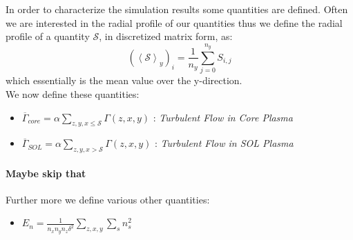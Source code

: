 \documentclass[master.tex]{subfiles}
\begin{document}
In order to characterize the simulation results some quantities are defined. Often we are interested in the radial profile of our quantities thus we define the radial profile of a quantity $\mathcal{S}$, in discretized matrix form, as:
\begin{equation}
    (\left<\mathcal{S}\right>_y)_i = \frac{1}{n_y} \sum_{j=0}^{n_y} S_{i, j}
\end{equation}
which essentially is the mean value over the y-direction.\\
We now define these quantities:

\begin{itemize}
    \item $\overline{\Gamma}_{core} = \alpha \sum_{z, y, x \leq \mathcal{S}} \Gamma(z,x,y)$ : \textit{Turbulent Flow in Core Plasma}
    \item $\overline{\Gamma}_{SOL} = \alpha \sum_{z, y, x > \mathcal{S}} \Gamma(z,x,y)$ : \textit{Turbulent Flow in SOL Plasma}
\end{itemize}
\paragraph{Maybe skip that}
Further more we define various other quantities:
\begin{itemize}
    \item $E_n = \frac{1}{n_x n_y n_z \delta^2}\sum_{z, x, y} \sum_s n_s^2$
\end{itemize}
\end{document}
